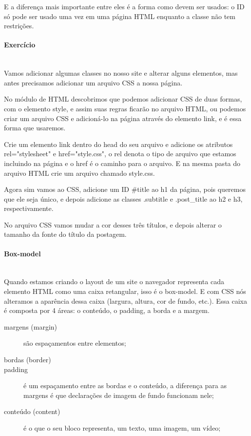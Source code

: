 \documentclass[12pt,a4paper]{article}
\begin{document}
	E a diferença mais importante entre eles é a forma como devem ser usados: o ID só pode ser usado uma vez em uma página HTML enquanto a classe não tem restrições.
	
	\paragraph{Exercício} \mbox{} \\
	
	Vamos adicionar algumas classes no nosso site e alterar alguns elementos, mas antes precisamos adicionar um arquivo CSS a nossa página.
	
	No módulo de HTML descobrimos que podemos adicionar CSS de duas formas, com o elemento style, e assim suas regras ficarão no arquivo HTML, ou podemos criar um arquivo CSS e adicioná-lo na página através do elemento link, e é essa forma que usaremos.
	
	Crie um elemento link dentro do head do seu arquivo e adicione os atributos rel="stylesheet" e href="style.css", o rel denota o tipo de arquivo que estamos incluindo na página e o href é o caminho para o arquivo. E na mesma pasta do arquivo HTML crie um arquivo chamado style.css.
	
	Agora sim vamos ao CSS, adicione um ID \#title ao h1 da página, pois queremos que ele seja único, e depois adicione as classes .subtitle e .post\_title ao h2 e h3, respectivamente.
	
	No arquivo CSS vamos mudar a cor desses três títulos, e depois alterar o tamanho da fonte do título da postagem.
	
	\paragraph{Box-model} \mbox{} \\
	
	Quando estamos criando o layout de um site o navegador representa cada elemento HTML  como uma caixa retangular, isso é o box-model. E com CSS nós alteramos a aparência dessa caixa (largura, altura, cor de fundo, etc.). Essa caixa é composta por 4 áreas: o conteúdo, o padding, a borda e a margem.
	
	\begin{description}
		\item[margens (margin)] são espaçamentos entre elementos;
		
		\item[bordas (border)]
		
		\item[padding] é um espaçamento entre as bordas e o conteúdo, a diferença para as margens é que declarações de imagem de fundo funcionam nele;
		
		\item[conteúdo (content)] é o que o seu bloco representa, um texto, uma imagem, um vídeo;
		
	\end{description}
	
\end{document}
